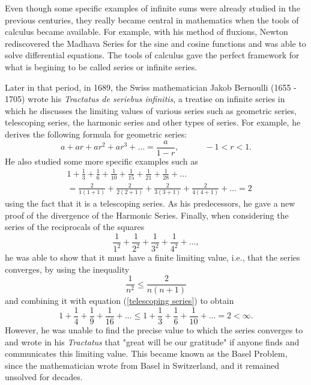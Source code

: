 Even though some specific examples of infinite sums were already studied in the previous centuries, they really became central in  mathematics when the tools of calculus became available. For example, with his method of fluxions, Newton rediscovered the Madhava Series for the sine and cosine functions and was able to solve differential equations. The tools of calculus gave the perfect framework for what is begining to be called series or infinite series.

Later in that period, in 1689, the Swiss mathematician Jakob Bernoulli (1655 - 1705) wrote his \textit{Tractatus de seriebus infinitis}, a treatise on infinite series in which he discusses the limiting values of various series such as geometric series, telescoping series, the harmonic series and other types of series. For example, he derives the following formula for geometric series:
\begin{equation}
    a + ar + ar^2 + ar^3 + \dots = \frac{a}{1-r}, \qquad \quad -1 < r < 1.
\end{equation}
He also studied some more specific examples such as
\begin{equation}\label{telescoping series}
    \begin{split}
        & 1 + \frac{1}{3} + \frac{1}{6} + \frac{1}{10} + \frac{1}{15} + \frac{1}{21} + \frac{1}{28} + \dots \\
        & = \frac{2}{1(1+1)} + \frac{2}{2(2+1)} + \frac{2}{3(3+1)} + \frac{2}{4(4+1)} + \dots = 2
    \end{split}
\end{equation}
using the fact that it is a telescoping series. As his predecessors, he gave a new proof of the divergence of the Harmonic Series. Finally, when considering the series of the reciprocals of the squares 
$$\frac{1}{1^2} + \frac{1}{2^2} + \frac{1}{3^2} + \frac{1}{4^2} + \dots,$$
he was able to show that it must have a finite limiting value, i.e., that the series converges, by using the inequality 
$$\frac{1}{n^2} \leq \frac{2}{n(n+1)}$$
and combining it with equation (\ref{telescoping series}) to obtain
$$1 + \frac{1}{4} + \frac{1}{9} + \frac{1}{16} + \dots \leq 1 + \frac{1}{3} + \frac{1}{6} + \frac{1}{10} + \dots = 2 < \infty.$$
However, he was unable to find the precise value to which the series converges to and wrote in his \textit{Tractatus} that "great will be our gratitude" if anyone finds and communicates this limiting value. This became known as the Basel Problem, since the mathematician wrote from Basel in Switzerland, and it remained unsolved for decades.

